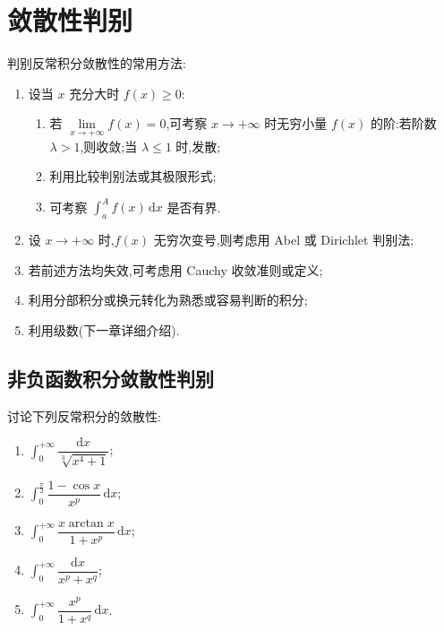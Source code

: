 \newpage

\section{敛散性判别}

\begin{remark}
  判别反常积分敛散性的常用方法:
  \begin{enumerate}
    \item 设当 $x$ 充分大时 $f(x)\geq0$:
          \begin{enumerate}
            \item 若 $\displaystyle\lim\limits_{x\to+\infty}f(x)=0$,可考察 $x\to+\infty$ 时无穷小量 $f(x)$ 的阶:若阶数 $\lambda>1$,则收敛;当 $\lambda\leq1$ 时,发散;
            \item 利用比较判别法或其极限形式;
            \item 可考察 $\displaystyle\int_a^Af(x)\,\mathrm{d}x$ 是否有界.
          \end{enumerate}
    \item 设 $x\to+\infty$ 时,$f(x)$ 无穷次变号,则考虑用 Abel 或 Dirichlet 判别法;
    \item 若前述方法均失效,可考虑用 Cauchy 收敛准则或定义;
    \item 利用分部积分或换元转化为熟悉或容易判断的积分;
    \item 利用级数(下一章详细介绍).
  \end{enumerate}
\end{remark}



\subsection{非负函数积分敛散性判别}

\begin{example}
  讨论下列反常积分的敛散性:
  \begin{enumerate}
    \item $\displaystyle\int_0^{+\infty}\dfrac{\mathrm{d}x}{\sqrt[3]{x^4+1}}$;
    \item $\displaystyle\int_0^{\frac{\pi}{2}}\dfrac{1-\cos x}{x^p}\,\mathrm{d}x$;
    \item $\displaystyle\int_0^{+\infty}\dfrac{x\arctan x}{1+x^p}\,\mathrm{d}x$;
    \item $\displaystyle\int_0^{+\infty}\dfrac{\mathrm{d}x}{x^p+x^q}$;
    \item $\displaystyle\int_0^{+\infty}\dfrac{x^p}{1+x^q}\,\mathrm{d}x$.
  \end{enumerate}
\end{example}
\exampleblank


